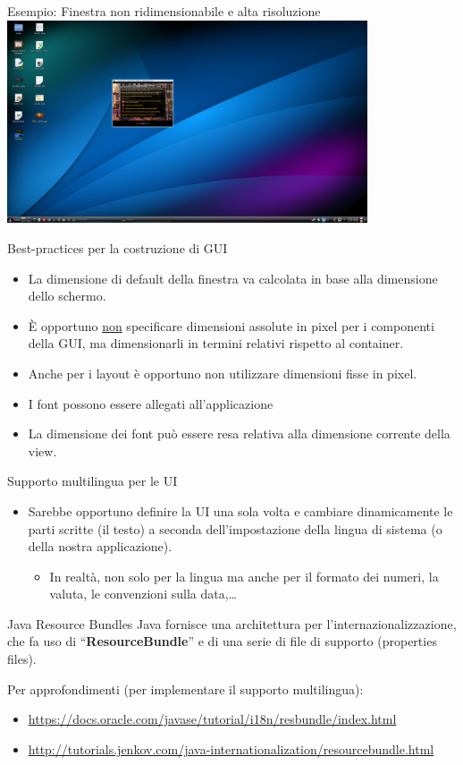 \documentclass[presentation]{beamer}
\begin{document}
\begin{frame}{Esempio: Finestra non ridimensionabile e alta risoluzione}
\centering
\includegraphics[width=0.8\textwidth]{img/brokensword}
\end{frame}

\begin{frame}{Best-practices per la costruzione di GUI}
\begin{itemize}\itemsep10pt
\item La dimensione di default della finestra va calcolata in base alla dimensione dello schermo.
\item \`{E} opportuno \underline{non} specificare dimensioni assolute in pixel per i componenti della GUI, ma dimensionarli in termini relativi rispetto al container.
\item Anche per i layout è opportuno non utilizzare dimensioni fisse in pixel.
\item I font possono essere allegati all'applicazione
\item La dimensione dei font può essere resa relativa alla dimensione corrente della view.
\end{itemize}
\end{frame}

\begin{frame}{Supporto multilingua per le UI}
\begin{itemize}
\item Sarebbe opportuno definire la UI una sola volta e cambiare dinamicamente le parti scritte (il testo) a seconda dell'impostazione della lingua di sistema (o della nostra applicazione).
\begin{itemize}
\item In realtà, non solo per la lingua ma anche per il formato dei numeri, la valuta, le convenzioni sulla data,\dots
\end{itemize}
\end{itemize}
\begin{block}{Java Resource Bundles}
Java fornisce una architettura per l'internazionalizzazione, che fa uso di ``\textbf{ResourceBundle}'' e di una serie di file di supporto (properties files).

Per approfondimenti (per implementare il supporto multilingua):
\begin{itemize}
\item \url{https://docs.oracle.com/javase/tutorial/i18n/resbundle/index.html}
\item \url{http://tutorials.jenkov.com/java-internationalization/resourcebundle.html}
\end{itemize}
\end{block}
\end{frame}
\end{document}
